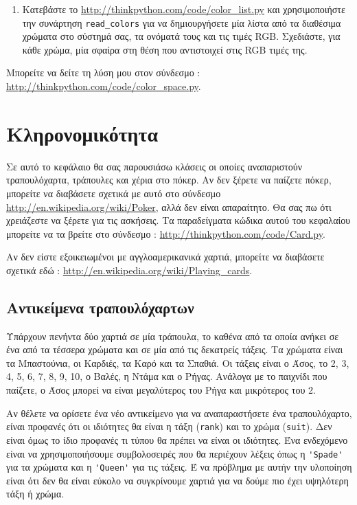 \documentclass[10pt]{book}
\begin{document}
\begin{exercise}
\begin{enumerate}
\item Κατεβάστε το  \url{http://thinkpython.com/code/color_list.py}  
και χρησιμοποιήστε την συνάρτηση  \verb"read_colors"  για να δημιουργήσετε 
μία λίστα από τα διαθέσιμα χρώματα στο σύστημά σας, τα ονόματά τους και τις τιμές 
 RGB.   Σχεδιάστε, για κάθε χρώμα, μία σφαίρα στη θέση που αντιστοιχεί στις 
 RGB  τιμές της.


\end{enumerate}

Μπορείτε να δείτε τη λύση μου στον σύνδεσμο :
\url{http://thinkpython.com/code/color_space.py}.

\end{exercise}


 
\chapter{Κληρονομικότητα}

Σε αυτό το κεφάλαιο θα σας παρουσιάσω κλάσεις οι οποίες αναπαριστούν τραπουλόχαρτα, τράπουλες και χέρια στο πόκερ.  Αν δεν ξέρετε να παίζετε πόκερ, μπορείτε να διαβάσετε 
σχετικά με αυτό στο σύνδεσμο  \url{http://en.wikipedia.org/wiki/Poker},  αλλά δεν 
είναι απαραίτητο. Θα σας πω ότι χρειάζεστε να ξέρετε για τις ασκήσεις. 
Τα παραδείγματα κώδικα αυτού του κεφαλαίου μπορείτε να τα βρείτε στο σύνδεσμο :
\url{http://thinkpython.com/code/Card.py}.

 Αν δεν είστε εξοικειωμένοι με αγγλοαμερικανικά χαρτιά, μπορείτε να διαβάσετε σχετικά εδώ :
\url{http://en.wikipedia.org/wiki/Playing_cards}.


 
\section{Αντικείμενα τραπουλόχαρτων}

Υπάρχουν πενήντα δύο χαρτιά σε μία τράπουλα, το καθένα από τα οποία ανήκει σε ένα από τα τέσσερα χρώματα και σε μία 
από τις δεκατρείς τάξεις.  Τα χρώματα είναι τα Μπαστούνια, οι Καρδιές, τα Καρό και τα Σπαθιά.  Οι τάξεις είναι ο 
Άσος, το 2, 3, 4, 5, 6, 7, 8, 9, 10, ο Βαλές, η Ντάμα και ο Ρήγας.  Ανάλογα με το παιχνίδι που παίζετε, ο Άσος μπορεί να 
είναι μεγαλύτερος του Ρήγα και μικρότερος του 2.

Αν θέλετε να ορίσετε ένα νέο αντικείμενο για να αναπαραστήσετε ένα τραπουλόχαρτο, είναι προφανές ότι οι ιδιότητες θα 
είναι η τάξη  ({\tt rank})  και το χρώμα  ({\tt suit}).   Δεν είναι όμως το ίδιο προφανές τι τύπου θα πρέπει να είναι οι ιδιότητες.  Ένα ενδεχόμενο είναι να χρησιμοποιήσουμε συμβολοσειρές που θα περιέχουν λέξεις όπως η  \verb"'Spade'"  
για τα χρώματα και η  \verb"'Queen'"  για τις τάξεις.  Έ να πρόβλημα με αυτήν την 
υλοποίηση είναι ότι δεν θα είναι εύκολο να συγκρίνουμε χαρτιά για να δούμε πιο έχει υψηλότερη τάξη ή χρώμα.
\end{document}
